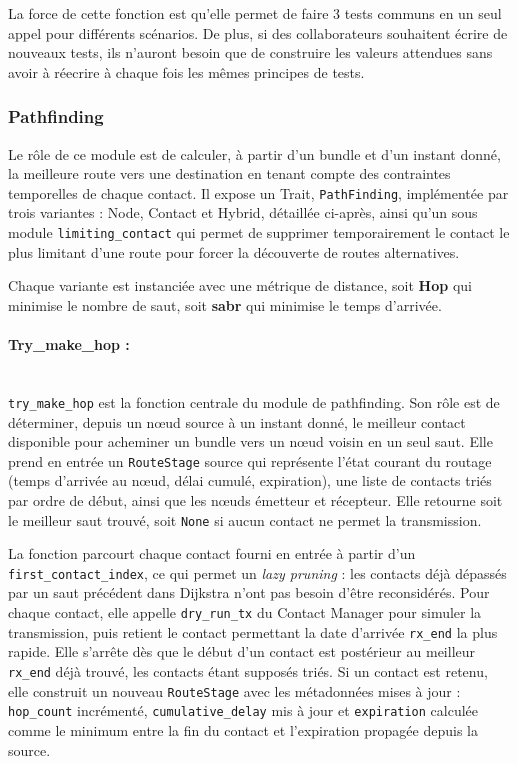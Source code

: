 \documentclass{article}
\begin{document}
La force de cette fonction est qu'elle permet de faire 3 tests communs en un seul appel pour différents scénarios. 
De plus, si des collaborateurs souhaitent écrire de nouveaux tests, ils n'auront besoin que de construire les valeurs attendues
sans avoir à réecrire à chaque fois les mêmes principes de tests.



\subsubsection[Module : Pathfinding]{Pathfinding}
Le rôle de ce module est de calculer, à partir d'un \gls{bundle} et d'un instant donné, la meilleure route vers
une destination en tenant compte des contraintes temporelles de chaque contact.
Il expose un Trait, \texttt{PathFinding}, implémentée par trois variantes : Node, Contact et Hybrid, détaillée ci-après,
ainsi qu'un sous module \texttt{limiting\_contact} qui permet de supprimer temporairement le contact le plus limitant d'une route 
pour forcer la découverte de routes alternatives. 

Chaque variante est instanciée avec une métrique de distance, soit \textbf{Hop} qui minimise le nombre de saut, 
soit \textbf{\gls{sabr}} qui minimise le temps d'arrivée.
\paragraph{Try\_make\_hop :}~\\

\texttt{try\_make\_hop} est la fonction centrale du module de pathfinding. Son rôle est de déterminer, depuis un nœud source à un instant donné, le meilleur contact disponible pour acheminer un bundle vers un nœud voisin en un seul saut. Elle prend en entrée un \texttt{RouteStage} source qui représente l'état courant du routage (temps d'arrivée au nœud, délai cumulé, expiration), une liste de contacts triés par ordre de début, ainsi que les nœuds émetteur et récepteur. Elle retourne soit le meilleur saut trouvé, soit \texttt{None} si aucun contact ne permet la transmission.

La fonction parcourt chaque contact fourni en entrée à partir d'un \texttt{first\_contact\_index}, ce qui permet un \textit{lazy pruning} : les contacts déjà dépassés par un saut précédent dans Dijkstra n'ont pas besoin d'être reconsidérés. Pour chaque contact, elle appelle \texttt{dry\_run\_tx} du Contact Manager pour simuler la transmission, puis retient le contact permettant la date d'arrivée \texttt{rx\_end} la plus rapide. Elle s'arrête dès que le début d'un contact est postérieur au meilleur \texttt{rx\_end} déjà trouvé, les contacts étant supposés triés. Si un contact est retenu, elle construit un nouveau \texttt{RouteStage} avec les métadonnées mises à jour : \texttt{hop\_count} incrémenté, \texttt{cumulative\_delay} mis à jour et \texttt{expiration} calculée comme le minimum entre la fin du contact et l'expiration propagée depuis la source.
\end{document}
